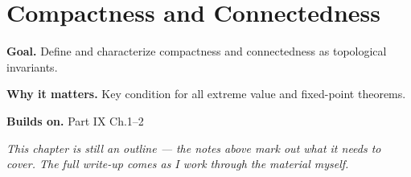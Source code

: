 \chapter{Compactness and Connectedness}
\label{ch:09-topology-03}

\begin{chapterintro}
\textbf{Goal.} Define and characterize compactness and connectedness as topological invariants.

\textbf{Why it matters.} Key condition for all extreme value and fixed-point theorems.

\textbf{Builds on.} Part IX Ch.1–2
\end{chapterintro}

\textit{This chapter is still an outline --- the notes above mark out what it needs to cover. The full write-up comes as I work through the material myself.}
